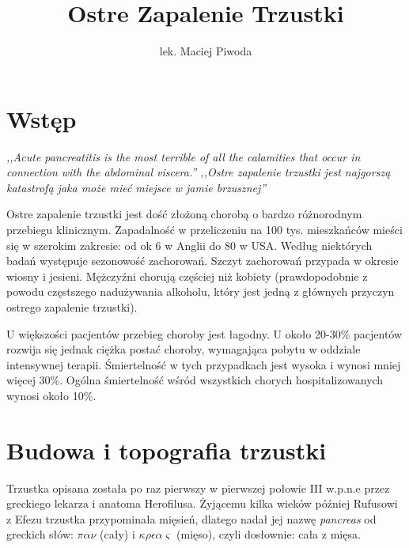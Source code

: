 \documentclass[a4paper, 12pt]{report}
\author{lek. Maciej Piwoda}
\title{Ostre Zapalenie Trzustki}
\begin{document}
\date{}
\maketitle
\tableofcontents
{}
\chapter*{Wstęp}

{\sl,,Acute pancreatitis is the most terrible of all the calamities
that occur in connection with the abdominal viscera.''
\newline
\newline
,,Ostre zapalenie trzustki jest najgorszą katastrofą jaka może mieć
miejsce w jamie brzusznej''}
{}
\newline
\newline
\newline
\begin{indent}
Ostre zapalenie trzustki jest dość złożoną chorobą o bardzo
różnorodnym przebiegu klinicznym. Zapadalność w przeliczeniu na 100
tys. mieszkańców mieści się w szerokim zakresie: od ok 6 w Anglii do
80 w USA. Według niektórych badań\cite{7} występuje sezonowość zachorowań.
Szczyt zachorowań przypada w okresie wiosny i jesieni.
Mężczyźni chorują częściej niż kobiety (prawdopodobnie z powodu
częstszego nadużywania alkoholu, który jest jedną z głównych przyczyn
ostrego zapalenie trzustki).

U większości pacjentów przebieg choroby jest łagodny. U około 20-30\%
pacjentów rozwija się jednak ciężka postać choroby, wymagająca pobytu
w oddziale intensywnej terapii. Śmiertelność w tych przypadkach jest
wysoka i wynosi mniej więcej 30\%. Ogólna śmiertelność wśród
wszystkich chorych hospitalizowanych wynosi około 10\%.
\end{indent}

\chapter{Budowa i topografia trzustki}

Trzustka opisana została po raz pierwszy w pierwszej połowie III
w.p.n.e przez greckiego lekarza i anatoma Herofilusa. Żyjącemu kilka 
wieków później Rufusowi z Efezu trzustka przypominała mięsień,
dlatego nadał jej nazwę \textsl{pancreas} od greckich słów:
$\pi\alpha\nu$ (cały) i $\kappa\rho\epsilon\alpha\varsigma$ (mięso), 
czyli dosłownie: cała z mięsa\cite{bochenek}.
\end{document}

